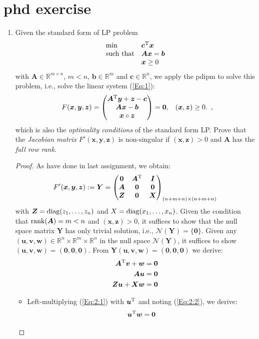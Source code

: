 \section*{phd exercise}
\begin{enumerate}
\item
Given the standard form of LP problem
\[
\begin{array}{ll}
\min&\bm c^{\mathrm T}\bm x\\
\mbox{such that}&\bm{Ax}=\bm b\\
&\bm x\ge0
\end{array}
\]
with $\bm A\in\mathbb{R}^{m\times n}$, $m<n$, $\bm b\in\mathbb{R}^m$ and $\bm c\in\mathbb{R}^n$, we apply the pdipm to solve this problem, i.e., solve the linear system (\ref{Eq:1}):
\begin{equation}
\begin{array}{ll}
F(\bm x,\bm y,\bm z)=\begin{pmatrix}
\bm A^{\mathrm T}\bm y+\bm z-\bm c\\
\bm{Ax}-\bm b\\
\bm x\circ\bm z
\end{pmatrix}=\bm0,
&
(\bm x,\bm z)\ge0.
\end{array},\label{Eq:1}
\end{equation}
which is also the \emph{optimality conditions} of the standard form LP. Prove that the \emph{Jacobian matrix} $F'(\bm x,\bm y,\bm z)$ is non-singular if $(\bm x,\bm z)>0$ and $\bm A$ has the \emph{full row rank}.
\begin{proof}
As have done in last assignment, we obtain:
\[
F'(\bm x,\bm y,\bm z):=\bm Y=\begin{pmatrix}
\bm0&\bm A^{\mathrm T}&\bm I\\
\bm A&\bm0&\bm0\\
\bm Z&\bm 0&\bm X
\end{pmatrix}_{(n+m+n)\times(n+m+n)}
\]
with $\bm Z=\operatorname{diag}(z_1,\dots,z_n)$ and $X=\operatorname{diag}(x_1,\dots,x_n)$. Given the condition that $\operatorname{rank}(\bm A)=m<n$ and $(\bm x,\bm z)>0$, it suffices to show that the null space matrix $\bm Y$ has only trivial solution, i.e., $\mathcal{N}(\bm Y)=\{\bm0\}$. Given any $(\bm u,\bm v,\bm w)\in\mathbb{R}^n\times\mathbb{R}^m\times\mathbb{R}^n$ in the null space $\mathcal{N}(\bm Y)$, it suffices to show $(\bm u,\bm v,\bm w)=(\bm0,\bm0,\bm0)$. From $\bm Y(\bm u,\bm v,\bm w)=(\bm0,\bm0,\bm0)$ we derive:
\begin{subequations}
\begin{align}
\bm A^{\mathrm T}\bm v+\bm w&=\bm0\label{Eq:2:1}\\
\bm A\bm u&=\bm0\label{Eq:2:2}\\
\bm Z\bm u+\bm X\bm w&=\bm0\label{Eq:2:3}
\end{align}
\end{subequations}
\begin{itemize}
\item
Left-multiplying (\ref{Eq:2:1}) with $\bm u^{\mathrm T}$ and noting (\ref{Eq:2:2}), we derive:
\begin{equation}
\bm u^{\mathrm T}\bm w=\bm0\label{Eq:3}
\end{equation}


\end{itemize}
\end{proof}
\end{enumerate}
